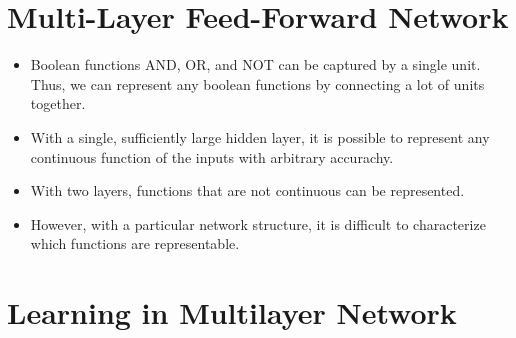\documentclass[10pt]{article}
\begin{document}
\section{Multi-Layer Feed-Forward Network}

\begin{itemize}
    \item Boolean functions AND, OR, and NOT can
        be captured by a single unit. Thus,
        we can represent any boolean functions
        by connecting a lot of units together.
        
    \item With a single, sufficiently large hidden layer,
        it is possible to represent any continuous function
        of the inputs with arbitrary accurachy.
        
    \item With two layers, functions that are not continuous
        can be represented.
        
    \item However, with a particular network structure,
        it is difficult to characterize which functions
        are representable.
\end{itemize}

\section{Learning in Multilayer Network}
\end{document}
